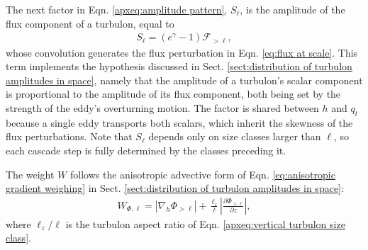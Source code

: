 \documentclass[acp, manuscript, english]{copernicus}
\begin{document}
The next factor in Eqn. \ref{apxeq:amplitude pattern}, $S_\ell$, is the amplitude of the flux component of a turbulon, equal to
\begin{align}
S_\ell = \left(e^{\gamma} - 1\right)\mathcal{F}_{>\ell}, \label{apxeq:scalar flux factor}
\end{align}
whose convolution generates the flux perturbation in Eqn. \ref{eq:flux at scale}. This term implements the hypothesis discussed in Sect. \ref{sect:distribution of turbulon amplitudes in space}, namely that the amplitude of a turbulon's scalar component is proportional to the amplitude of its flux component, both being set by the strength of the eddy's overturning motion. The factor is shared between $h$ and $q_t$ because a single eddy transports both scalars, which inherit the skewness of the flux perturbations. Note that $S_\ell$ depends only on size classes larger than $\ell$, so each cascade step is fully determined by the classes preceding it.


The weight $W$ follows the anisotropic advective form of Eqn. \ref{eq:anisotropic gradient weighing} in Sect. \ref{sect:distribution of turbulon amplitudes in space}:
\begin{align}
  W_{\Phi, \ell} =  | \nabla_h \Phi_{>\ell}| + \frac{\ell_z}{\ell}\left|\frac{\partial \Phi_{>\ell}}{\partial z}\right|, \label{apxeq:advective weight}
\end{align}
where $\ell_z/\ell$ is the turbulon aspect ratio of Eqn. \ref{apxeq:vertical turbulon size class}. 
\end{document}
